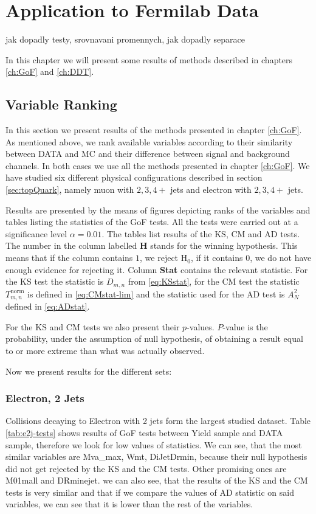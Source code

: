 \chapter{Application to Fermilab Data}
jak dopadly testy, srovnavani promennych, jak dopadly separace

\noindent In this chapter we will present some results of methods described in chapters \ref{ch:GoF} and \ref{ch:DDT}. 

\section{Variable Ranking}
In this section we present results  of the methods presented in chapter \ref{ch:GoF}. As mentioned above, we rank available variables according to their similarity between DATA and MC and their difference between signal and background channels. In both cases we use all the methods presented in chapter \ref{ch:GoF}. We have studied six different physical configurations described in section \ref{sec:topQuark}, namely muon with $2, 3, 4+$ jets and electron with $2, 3, 4+$ jets. 

Results are presented by the means of figures depicting ranks of the variables and tables listing the statistics of the GoF tests. All the tests were carried out at a significance level $\alpha = 0.01.$ The tables list results of the KS, CM and AD tests. The number in the column labelled \textbf{H} stands for the winning hypothesis. This means that if the column contains $1$, we reject $\mathrm{H}_0$, if it contains $0$, we do not have enough evidence for rejecting it. Column \textbf{Stat} contains the relevant statistic. For the KS test the statistic is $D_{m,n}$ from \eqref{eq:KSstat}, for the CM test the statistic $T^{\mathrm{norm}}_{m,n}$ is defined in \eqref{eq:CMstat-lim} and the statistic used for the AD test is $A_N^2$ defined in \eqref{eq:ADstat}. 

For the KS and CM tests we also present their $p$-values. $P$-value is the probability, under the assumption of null hypothesis, of obtaining a result equal to or more extreme than what was actually observed. 

Now we present results for the different sets:

\subsection{Electron, 2 Jets}
Collisions decaying to Electron with 2 jets form the largest studied dataset. Table \ref{tab:e2j-tests} shows results of GoF tests between Yield sample and DATA sample, therefore we look for low values of statistics. We can see, that the most similar variables are \textsf{Mva\_max, Wmt, DiJetDrmin}, because their null hypothesis did not   get rejected by the KS and the CM tests. Other promising ones are \textsf{M01mall and DRminejet}. we can also see, that the results of the KS and the CM tests is very similar and that if we compare the values of AD statistic on said variables, we can see that it is lower than the rest of the  variables. 

